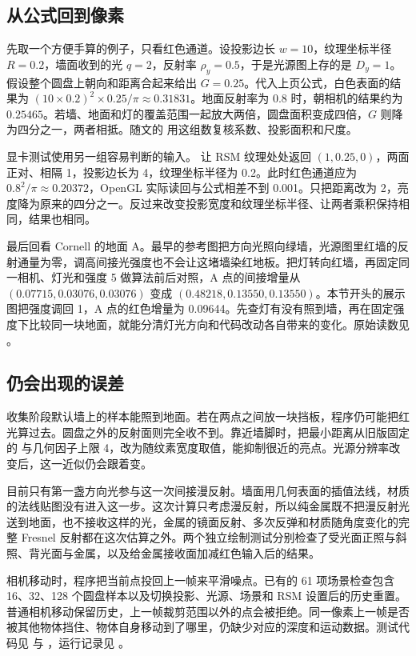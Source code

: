 \subsection{从公式回到像素}

先取一个方便手算的例子，只看红色通道。设投影边长 $w=10$，纹理坐标半径 $R=0.2$，墙面收到的光 $q=2$，反射率 $\rho_y=0.5$，于是光源图上存的是 $D_y=1$。假设整个圆盘上朝向和距离合起来给出 $G=0.25$。代入上页公式，白色表面的结果为 $(10\times0.2)^2\times 0.25/\pi\approx0.31831$。地面反射率为 $0.8$ 时，朝相机的结果约为 $0.25465$。若墙、地面和灯的覆盖范围一起放大两倍，圆盘面积变成四倍，$G$ 则降为四分之一，两者相抵。随文的  用这组数复核系数、投影面积和尺度。

显卡测试使用另一组容易判断的输入。 让 RSM 纹理处处返回 $(1,0.25,0)$，两面正对、相隔 1，投影边长为 4，纹理坐标半径为 0.2。此时红色通道应为 $0.8^2/\pi\approx0.20372$，OpenGL 实际读回与公式相差不到 0.001。只把距离改为 2，亮度降为原来的四分之一。反过来改变投影宽度和纹理坐标半径、让两者乘积保持相同，结果也相同。

最后回看 Cornell 的地面 A。最早的参考图把方向光照向绿墙，光源图里红墙的反射通量为零，调高间接光强度也不会让这堵墙染红地板。把灯转向红墙，再固定同一相机、灯光和强度 5 做算法前后对照，A 点的间接增量从 $(0.07715,0.03076,0.03076)$ 变成 $(0.48218,0.13550,0.13550)$。本节开头的展示图把强度调回 1，A 点的红色增量为 0.09644。先查灯有没有照到墙，再在固定强度下比较同一块地面，就能分清灯光方向和代码改动各自带来的变化。原始读数见 。

\subsection{仍会出现的误差}

收集阶段默认墙上的样本能照到地面。若在两点之间放一块挡板，程序仍可能把红光算过去。圆盘之外的反射面则完全收不到。靠近墙脚时，把最小距离从旧版固定的  与几何因子上限 4，改为随纹素宽度取值，能抑制很近的亮点。光源分辨率改变后，这一近似仍会跟着变。

目前只有第一盏方向光参与这一次间接漫反射。墙面用几何表面的插值法线，材质的法线贴图没有进入这一步。这次计算只考虑漫反射，所以纯金属既不把漫反射光送到地面，也不接收这样的光，金属的镜面反射、多次反弹和材质随角度变化的完整 Fresnel 反射都在这次估算之外。两个独立绘制测试分别检查了受光面正照与斜照、背光面与金属，以及给金属接收面加减红色输入后的结果。

相机移动时，程序把当前点投回上一帧来平滑噪点。已有的 61 项场景检查包含 16、32、128 个圆盘样本以及切换投影、光源、场景和 RSM 设置后的历史重置。普通相机移动保留历史，上一帧裁剪范围以外的点会被拒绝。同一像素上一帧是否被其他物体挡住、物体自身移动到了哪里，仍缺少对应的深度和运动数据。测试代码见  与 ，运行记录见 。
